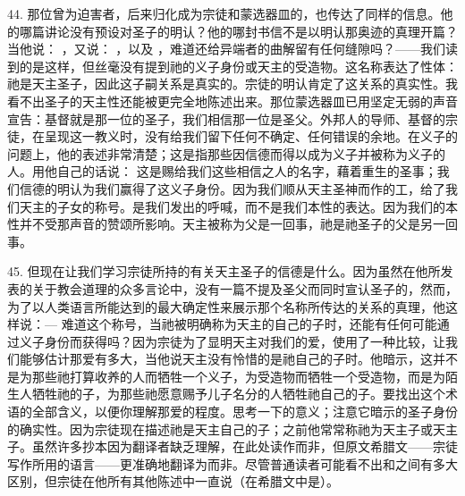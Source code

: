 44. 那位曾为迫害者，后来归化成为宗徒和蒙选器皿的，也传达了同样的信息。他的哪篇讲论没有预设对圣子的明认？他的哪封书信不是以明认那奥迹的真理开篇？当他说： ，又说： ，以及 ，难道还给异端者的曲解留有任何缝隙吗？——我们读到的是这样，但丝毫没有提到祂的义子身份或天主的受造物。这名称表达了性体：祂是天主圣子，因此这子嗣关系是真实的。宗徒的明认肯定了这关系的真实性。我看不出圣子的天主性还能被更完全地陈述出来。那位蒙选器皿已用坚定无弱的声音宣告：基督就是那一位的圣子，我们相信那一位是圣父。外邦人的导师、基督的宗徒，在呈现这一教义时，没有给我们留下任何不确定、任何错误的余地。在义子的问题上，他的表述非常清楚；这是指那些因信德而得以成为义子并被称为义子的人。用他自己的话说： 这是赐给我们这些相信之人的名字，藉着重生的圣事；我们信德的明认为我们赢得了这义子身份。因为我们顺从天主圣神而作的工，给了我们天主的子女的称号。是我们发出的呼喊，而不是我们本性的表达。因为我们的本性并不受那声音的赞颂所影响。天主被称为父是一回事，祂是祂圣子的父是另一回事。\par

45. 但现在让我们学习宗徒所持的有关天主圣子的信德是什么。因为虽然在他所发表的关于教会道理的众多言论中，没有一篇不提及圣父而同时宣认圣子的，然而，为了以人类语言所能达到的最大确定性来展示那个名称所传达的关系的真理，他这样说：—  难道这个称号，当祂被明确称为天主的自己的子时，还能有任何可能通过义子身份而获得吗？因为宗徒为了显明天主对我们的爱，使用了一种比较，让我们能够估计那爱有多大，当他说天主没有怜惜的是祂自己的子时。他暗示，这并不是为那些祂打算收养的人而牺牲一个义子，为受造物而牺牲一个受造物，而是为陌生人牺牲祂的子，为那些祂愿意赐予儿子名分的人牺牲祂自己的子。要找出这个术语的全部含义，以便你理解那爱的程度。思考一下的意义；注意它暗示的圣子身份的确实性。因为宗徒现在描述祂是天主自己的子；之前他常常称祂为天主子或天主子。虽然许多抄本因为翻译者缺乏理解，在此处读作而非，但原文希腊文——宗徒写作所用的语言——更准确地翻译为而非。尽管普通读者可能看不出和之间有多大区别，但宗徒在他所有其他陈述中一直说（在希腊文中是）。\par


